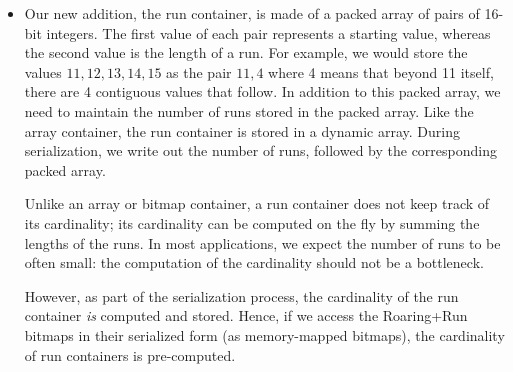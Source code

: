 \documentclass[times]{speauth}
\begin{document}
\begin{itemize}
We implement array containers as dynamic arrays that grow their capacity
using a standard approach. That is, we keep a count of the used entries in an underlying array that has typically some excess capacity. When the array needs to grow beyond its capacity, we allocate a larger array and copy the data to this new array. Our allocation heuristic is as follow: when the capacity is small (fewer than 64~entries), we double the capacity;
when the capacity is moderate (between 64 and 1067~entries), we multiply the capacity by $3/2$;
when the capacity is large (1067~entries and more), we multiply the capacity by $5/4$.
Furthermore, we never allocate more than the maximum needed (\num{4096}) and if we are within one sixteenth of the
 maximum ($>3840$), then we allocate the maximum right away (\num{4096})
 to avoid any future reallocation. A simpler heuristic where we double the capacity whenever it is insufficient would be faster, but it would allocate on average (over all possible sizes) a capacity that exceeds the size by \SI{50}{\percent}
 whereas the capacity exceeds the size by only \SI{13}{\percent} in our model. In this sense, we trade speed for reduced memory usage.
When the array container is no longer expected to grow, the programmer can use a \texttt{trim} function to copy the data to a new array with no excess capacity.
\item Our new addition, the run container, is made of a packed array of pairs of 16-bit integers. The first value of each pair represents a starting value, whereas the second value is the length of a run.
For example, we would store the values $ 11,12,13,14,15$ as the pair $11,4$ where 4 means that beyond 11 itself, there are 4 contiguous values that follow. In addition to this packed array, we need to maintain the  number of runs stored in the packed array. Like the array container, the run container is stored in a dynamic array. 
During serialization, we write out
the number of runs,
followed by the corresponding packed array.

Unlike
an array or bitmap container, a run container does not keep track of its cardinality; its
cardinality can be computed on the fly by summing
the lengths of the runs. In most applications, we expect the number of runs to be often small: 
the computation of the cardinality should not be a bottleneck.

However, as part of the serialization process, the cardinality
of the run container \emph{is} computed and stored. Hence, if we access the Roaring+Run  bitmaps in their serialized form (as memory-mapped bitmaps), the cardinality of run containers is pre-computed.
\end{itemize}
\end{document}
